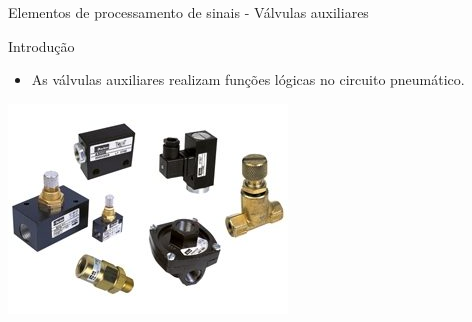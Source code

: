 \begin{frame}{Elementos de processamento de sinais - Válvulas auxiliares}
	\begin{block}{Introdução}
		\begin{itemize}
			\item As válvulas auxiliares realizam funções lógicas no circuito pneumático.
		\end{itemize}
	\end{block}

	\medskip
	
	\centering
	\includegraphics[width=0.7\linewidth]{Figuras/Ch14/fig20n2}
	
\end{frame}



